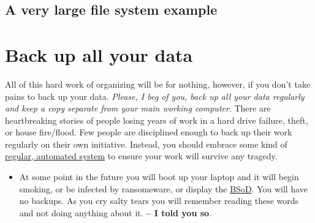 \subsection{A very large file system example}

{\large
{}  
}

\section{Back up all your data}

All of this hard work of organizing will be for nothing, however, if you don't take pains to back up your data. \emph{Please, I beg of you, back up all your data regularly and keep a copy separate from your main working computer}. There are heartbreaking stories of people losing years of work in a hard drive failure, theft, or house fire/flood. Few people are disciplined enough to back up their work regularly on their own initiative. Instead, you should embrace some kind of \href{https://www.jwz.org/blog/2007/09/psa-backups/}{regular, automated system} to ensure your work will survive any tragedy. 

\begin{itemize}
\item At some point in the future you will boot up your laptop and it will begin smoking, or be infected by ransomeware, or display the \href{https://en.wikipedia.org/wiki/Blue_Screen_of_Death}{BSoD}. You will have no backups. As you cry salty tears you will remember reading these words and not doing anything about it. \textbf{ -- I told you so}.
\end{itemize}
